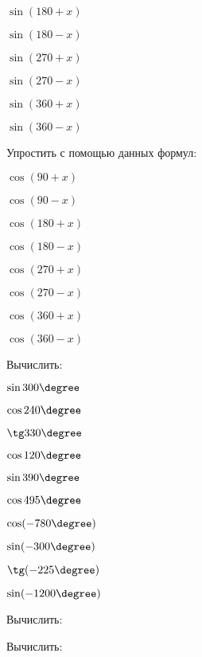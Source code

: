 \begin{class}[number=2]
\begin{listofex}
\begin{enumcols}[itemcolumns=4]
			\item \( \sin(180+x)\)
			\item \( \sin(180-x)\)
			\item \( \sin(270+x)\)
			\item \( \sin(270-x)\)
			\item \( \sin(360+x)\)
			\item \( \sin(360-x)\)
		\end{enumcols}
		\item Упростить с помощью данных формул:
		\begin{enumcols}[itemcolumns=4]
			\item \( \cos(90+x)\)
			\item \( \cos(90-x)\)
			\item \( \cos(180+x)\)
			\item \( \cos(180-x)\)
			\item \( \cos(270+x)\)
			\item \( \cos(270-x)\)
			\item \( \cos(360+x)\)
			\item \( \cos(360-x)\)
		\end{enumcols}
		\item Вычислить:
		\begin{enumcols}[itemcolumns=5]
			\item \( \sin 300\degree \)
			\item \( \cos 240\degree \)
			\item \( \tg 330\degree \)
			\item \( \cos 120\degree \)
			\item \( \sin 390\degree \)
			\item \( \cos 495\degree \)
			\item \( \cos (-780\degree) \)
			\item \( \sin (-300\degree) \)
			\item \( \tg (-225\degree) \)
			\item \( \sin (-1200\degree) \)
		\end{enumcols}
		\item Вычислить:
		\begin{enumcols}[itemcolumns=4]
			\item {}
			\item {}
			\item {}
			\item {}
		\end{enumcols}
		\item Вычислить:

\end{listofex}
\end{class}
